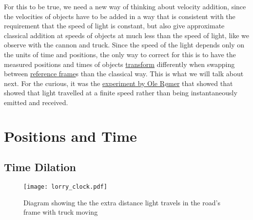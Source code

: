 For this to be true, we need a new way of thinking about velocity addition, since the velocities of objects have to be added in a way that is consistent with the requirement that the speed of light is constant, but also give approximate classical addition at speeds of objects at much less than the speed of light, like we observe with the cannon and truck. Since the speed of the light depends only on the units of time and positions, the only way to correct for this is to have the measured positions and times of objects \hyperlink{def-transform}{transform} differently when swapping between \hyperlink{def-Reference-frame}{reference frame}s than the classical way. This is what we will talk about next.
For the curious, it was the \href{https://scienceready.com.au/pages/determination-of-speed-of-light}{experiment by Ole Rømer} that showed that showed that light travelled at a finite speed rather than being instantaneously emitted and received. 


\section{Positions and Time}
\subsection{Time Dilation}

\begin{figure}[H]
\centering
       \texttt{[image: lorry\_clock.pdf]}
    \caption{Diagram showing the the extra distance light travels in the road's frame with truck moving}
    \label{fig: truck clock}
\end{figure}

